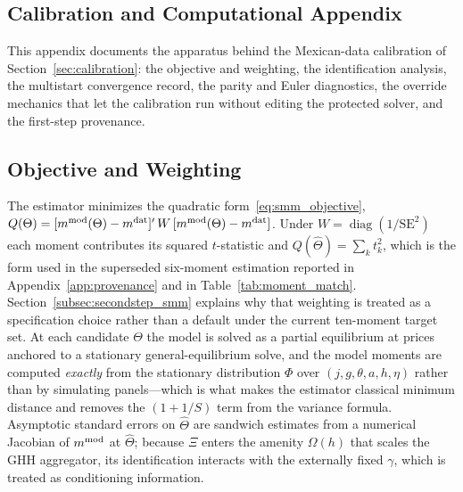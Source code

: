 \documentclass[12pt,a4paper]{article}
\begin{document}
\begin{appendices}
\section{Calibration and Computational Appendix}
\label{app:calibration}

This appendix documents the apparatus behind the Mexican-data calibration of Section~\ref{sec:calibration}: the objective and weighting, the identification analysis, the multistart convergence record, the parity and Euler diagnostics, the override mechanics that let the calibration run without editing the protected solver, and the first-step provenance.

\subsection{Objective and Weighting}
\label{app:smm_objective}

The estimator minimizes the quadratic form~\eqref{eq:smm_objective}, $Q(\Theta)=[m^{\rm mod}(\Theta)-m^{\rm dat}]'\,W\,[m^{\rm mod}(\Theta)-m^{\rm dat}]$. Under $W=\operatorname{diag}(1/\mathrm{SE}^2)$ each moment contributes its squared $t$-statistic and $Q(\widehat\Theta)=\sum_k t_k^2$, which is the form used in the superseded six-moment estimation reported in Appendix~\ref{app:provenance} and in Table~\ref{tab:moment_match}. Section~\ref{subsec:secondstep_smm} explains why that weighting is treated as a specification choice rather than a default under the current ten-moment target set. At each candidate $\Theta$ the model is solved as a partial equilibrium at prices anchored to a stationary general-equilibrium solve, and the model moments are computed \emph{exactly} from the stationary distribution $\Phi$ over $(j,g,\theta,a,h,\eta)$ rather than by simulating panels---which is what makes the estimator classical minimum distance and removes the $(1+1/S)$ term from the variance formula. Asymptotic standard errors on $\widehat\Theta$ are sandwich estimates from a numerical Jacobian of $m^{\rm mod}$ at $\widehat\Theta$; because $\Xi$ enters the amenity $\Omega(h)$ that scales the GHH aggregator, its identification interacts with the externally fixed $\gamma$, which is treated as conditioning information.


\end{appendices}
\end{document}
